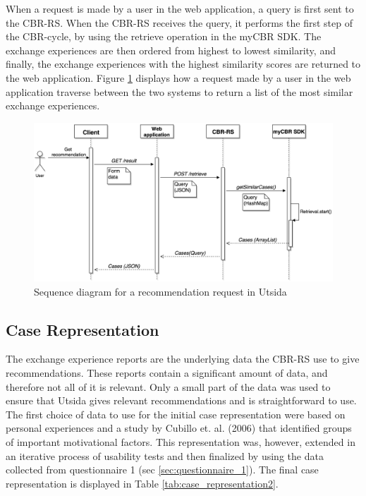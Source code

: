 When a request is made by a user in the web application, a query is first sent to the CBR-RS. When the CBR-RS receives the query, it performs the first step of the CBR-cycle, by using the retrieve operation in the myCBR SDK. The exchange experiences are then ordered from highest to lowest similarity, and finally, the exchange experiences with the highest similarity scores are returned to the web application. Figure \ref{fig:retrieval_process_diagram} displays how a request made by a user in the web application traverse between the two systems to return a list of the most similar exchange experiences.

\begin{figure}[h]
    \centering
    \includegraphics[width=1\textwidth]{fig/RetrievalProcessDiagram.png}
    \caption{Sequence diagram for a recommendation request in Utsida}
    \label{fig:retrieval_process_diagram}
\end{figure}

\subsection{Case Representation}

The exchange experience reports are the underlying data the CBR-RS use to give recommendations. These reports contain a significant amount of data, and therefore not all of it is relevant. Only a small part of the data was used to ensure that Utsida gives relevant recommendations and is straightforward to use. The first choice of data to use for the initial case representation were based on personal experiences and a study by Cubillo et. al. (2006) \cite{maria2006international} that identified groups of important motivational factors. This representation was, however, extended in an iterative process of usability tests and then finalized by using the data collected from questionnaire 1 (sec \ref{sec:questionnaire_1}). The final case representation is displayed in Table \ref{tab:case_representation2}. 

